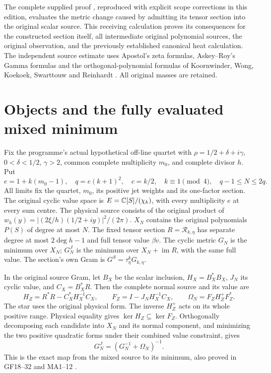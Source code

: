 The complete supplied proof \cite{mrjm:Input}, reproduced with explicit
scope corrections in this edition, evaluates the metric change caused by
admitting its tensor section into the original scalar source.
This receiving calculation proves its consequences for the constructed
section itself, all intermediate original polynomial sources, the original
observation, and the previously established canonical heat calculation.
The independent source estimate uses Apostol's zeta formulas,
Askey--Roy's Gamma formulas and the orthogonal-polynomial formulas of
Koornwinder, Wong, Koekoek, Swarttouw and Reinhardt
\cite{mrjm:Apostol,mrjm:Gamma,mrjm:MP}. All original masses are retained.

\section{Objects and the fully evaluated mixed minimum}
Fix the programme's actual hypothetical off-line quartet with
$\rho=1/2+\delta+i\gamma$, $0<\delta<1/2$, $\gamma>2$, common complete
multiplicity $m_0$, and complete divisor $h$. Put
\[
 e=1+k(m_0-1),\quad q=e(k+1)^2,\quad c=k/2,\quad
 k\equiv1\pmod4,\quad q-1\le N\le2q.
 \tag{JM1}
\]
All limits fix the quartet, $m_0$, its positive jet weights and its
one-factor section. The original cyclic value space is
$E=\mathbb C[S]/(\chi_k)$, with every multiplicity $e$ at every sum centre.
The physical source consists of the original product of
$w_h(y)=|(2\xi/h)(1/2+iy)|^2/(2\pi)$.
$X_N$ contains the original polynomials $P(S)$ of degree at most $N$.
The fixed tensor section $R=\mathcal R_{k,\eta}$ has separate degree
at most $2\deg h-1$ and full tensor value $\beta v$.
The cyclic metric $G_N$ is the minimum over $X_N$; $G_N^J$ is the
minimum over $X_N+\operatorname{im}R$, with the same full value.
The section's own Gram is $G^S=\tau_\eta^kG_{k,\eta}$.

In the original source Gram, let $B_X$ be the scalar inclusion,
$H_X=B_X^*B_X$, $J_N$ its cyclic value, and $C_X=B_X^*R$.
Then the complete normal source and its value are
\[
 H_Z=R^*R-C_X^*H_X^{-1}C_X,\qquad
 F_Z=I-J_NH_X^{-1}C_X,\qquad
 \Omega_N=F_ZH_Z^+F_Z^*.
 \tag{JM2}
\]
The star uses the original physical form. The inverse $H_Z^+$ acts on
its whole positive range. Physical equality gives
$\ker H_Z\subseteq\ker F_Z$. Orthogonally decomposing each candidate
into $X_N$ and its normal component, and minimizing the two positive
quadratic forms under their combined value constraint, gives
\[
 G_N^J=(G_N^{-1}+\Omega_N)^{-1}.\tag{JM3}
\]
This is the exact map from the mixed source to its minimum, also proved
in GF18--32 and MA1--12 \cite{mrjm:GF,mrjm:MA}.

